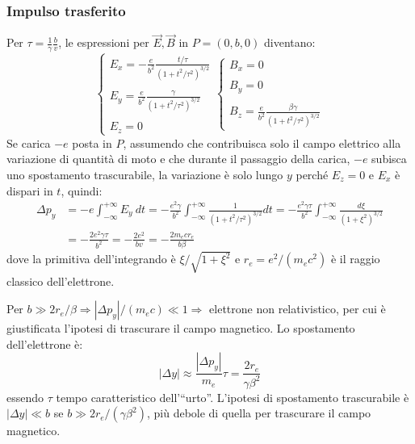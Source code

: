 \documentclass[10pt, a4paper]{scrartcl}
\numberwithin{equation}{subsection}
\theoremstyle{style1}
\begin{document}
\subsubsection{Impulso trasferito}
Per $\tau  = \frac{1}{\gamma} \frac{b}{v}$, le espressioni per $\vec{E},\vec{B}$ in $P=(0,b,0)$ diventano:
\[
\begin{cases}
\displaystyle E_x = -\frac{e}{b^2} \frac{t / \tau }{(1+t^2 / \tau ^2) ^{3 / 2} }\\
\\
\displaystyle E_y = \frac{e }{b^2} \frac{\gamma}{(1+t^2 / \tau ^2)^{3 / 2} }\\
\\
E_z = 0
\end{cases}
\begin{cases}
	B_x = 0\\
	\\
	B_y = 0\\
	\\
	B_z = \displaystyle \frac{e}{b^2}\frac{\beta \gamma}{(1+t^2 / \tau ^2)^{3 / 2} }
\end{cases}
\] 
Se carica $-e$ posta in $P$, assumendo che contribuisca solo il campo elettrico alla variazione di quantit\`a di moto e che durante il passaggio della carica, $-e$ subisca uno spostamento trascurabile, la variazione \`e solo lungo $y$ perch\'e $E_z= 0 $ e $E_x$ \`e dispari in $t$, quindi:
\begin{equation}
	\begin{split}
		\Delta p_y &= - e \int_{-\infty} ^{+\infty} E_y \ dt= - \frac{e^2 \gamma}{b^2} \int_{-\infty} ^{+\infty} \frac{1}{(1+ t^2 / \tau ^2)^{3 / 2} } dt  = -\frac{e^2 \gamma \tau }{b^2} \int_{-\infty} ^{+\infty} \frac{d\xi }{(1+\xi ^2)^{3 / 2} } \\
		&=- \frac{2e^2 \gamma \tau }{b^2}= - \frac{2e^2}{bv}= - \frac{2m_e cr_e}{b \beta }
	\end{split}
\end{equation}
dove la primitiva dell'integrando \`e $\xi / \sqrt{1+\xi ^2} $ e $r_e = e^2 / (m_ec^2)$ \`e il raggio classico dell'elettrone. 

Per $b \gg 2r_e / \beta \Rightarrow \left\lvert \Delta p_y \right\rvert / (m_e c) \ll 1 \Rightarrow $ elettrone non relativistico, per cui \`e giustificata l'ipotesi di trascurare il campo magnetico. Lo spostamento dell'elettrone \`e:
\begin{equation}
	\left\lvert \Delta y \right\rvert \approx  \frac{\left\lvert \Delta p_y \right\rvert }{m_e } \tau  = \frac{2r_e}{\gamma\beta ^2}
\end{equation}
essendo $\tau $ tempo caratteristico dell'``urto''. L'ipotesi di spostamento trascurabile \`e $\left\lvert \Delta  y \right\rvert \ll b$ se $ b\gg 2r_e / (\gamma\beta ^2)$, pi\`u debole di quella per trascurare il campo magnetico.
\end{document}
